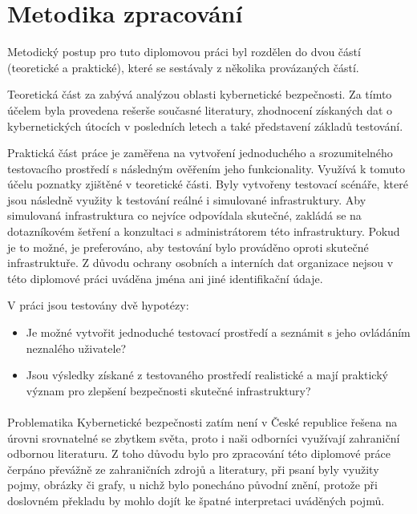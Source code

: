 \section{Metodika zpracování}\label{sec:metodika-zpracovani}
Metodický postup pro tuto diplomovou práci byl rozdělen do dvou částí (teoretické a praktické), které se sestávaly z několika provázaných částí.

Teoretická část za zabývá analýzou oblasti kybernetické bezpečnosti.
Za tímto účelem byla provedena rešerše současné literatury, zhodnocení získaných dat o kybernetických útocích v posledních letech a také představení základů testování.

Praktická část práce je zaměřena na vytvoření jednoduchého a srozumitelného testovacího prostředí s následným ověřením jeho funkcionality.
Využívá k tomuto účelu poznatky zjištěné v teoretické části.
Byly vytvořeny testovací scénáře, které jsou následně využity k testování reálné i simulované infrastruktury.
Aby simulovaná infrastruktura co nejvíce odpovídala skutečné, zakládá se na dotazníkovém šetření a konzultaci s administrátorem této infrastruktury.
Pokud je to možné, je preferováno, aby testování bylo prováděno oproti skutečné infrastruktuře.
Z důvodu ochrany osobních a interních dat organizace nejsou v této diplomové práci uváděna jména ani jiné identifikační údaje.

V práci jsou testovány dvě hypotézy:

\begin{itemize}
	\item Je možné vytvořit jednoduché testovací prostředí a seznámit s jeho ovládáním neznalého uživatele?
	\item Jsou výsledky získané z testovaného prostředí realistické a mají praktický význam pro zlepšení bezpečnosti skutečné infrastruktury?
\end{itemize}

\paragraph{}
Problematika Kybernetické bezpečnosti zatím není v České republice řešena na úrovni srovnatelné se zbytkem světa, proto i naši odborníci využívají zahraniční odbornou literaturu.
Z toho důvodu bylo pro zpracování této diplomové práce čerpáno převážně ze zahraničních zdrojů a literatury, při psaní byly využity pojmy, obrázky či grafy, u nichž bylo ponecháno původní znění, protože při doslovném překladu by mohlo dojít ke špatné interpretaci uváděných pojmů.


